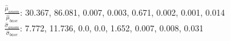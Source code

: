 $\frac{\hat\mu_{anom}}{\hat\mu_{base}}$: 30.367, 86.081, 0.007, 0.003, 0.671, 0.002, 0.001, 0.014\\$\frac{\hat\sigma_{anom}}{\hat\sigma_{base}}$: 7.772, 11.736, 0.0, 0.0, 1.652, 0.007, 0.008, 0.031